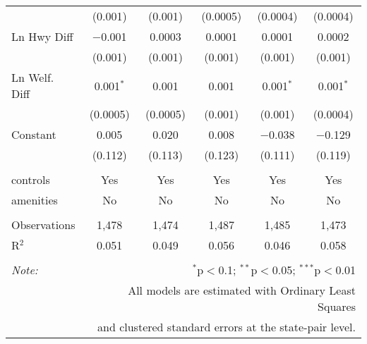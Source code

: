 \begin{table}[!htbp]
\begin{tabular}{@{\extracolsep{5pt}}lccccc}
  & (0.001) & (0.001) & (0.0005) & (0.0004) & (0.0004) \\ 
  Ln Hwy Diff & $-$0.001 & 0.0003 & 0.0001 & 0.0001 & 0.0002 \\ 
  & (0.001) & (0.001) & (0.001) & (0.001) & (0.001) \\ 
  Ln Welf. Diff & 0.001$^{*}$ & 0.001 & 0.001 & 0.001$^{*}$ & 0.001$^{*}$ \\ 
  & (0.0005) & (0.0005) & (0.001) & (0.001) & (0.0004) \\ 
  Constant & 0.005 & 0.020 & 0.008 & $-$0.038 & $-$0.129 \\ 
  & (0.112) & (0.113) & (0.123) & (0.111) & (0.119) \\ 
 \hline \\[-1.8ex] 
controls & Yes & Yes & Yes & Yes & Yes \\ 
amenities & No & No & No & No & No \\ 
\hline \\[-1.8ex] 
Observations & 1,478 & 1,474 & 1,487 & 1,485 & 1,473 \\ 
R$^{2}$ & 0.051 & 0.049 & 0.056 & 0.046 & 0.058 \\ 
\hline 
\hline \\[-1.8ex] 
\textit{Note:}  & \multicolumn{5}{r}{$^{*}$p$<$0.1; $^{**}$p$<$0.05; $^{***}$p$<$0.01} \\ 
 & \multicolumn{5}{r}{All models are estimated with Ordinary Least Squares} \\ 
 & \multicolumn{5}{r}{and clustered standard errors at the state-pair level.} \\ 
\end{tabular} 
\end{table} 
